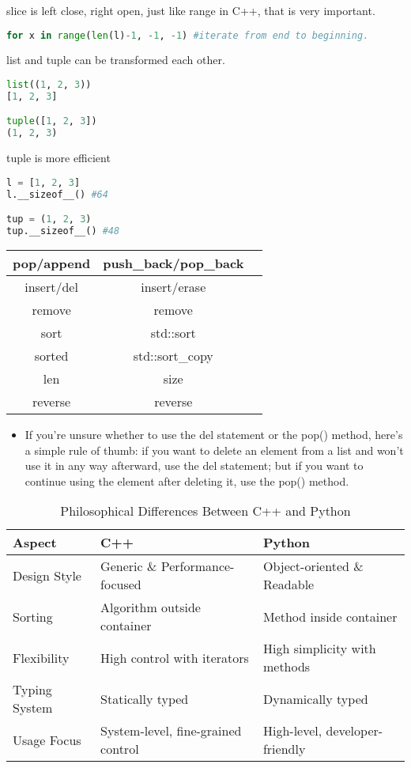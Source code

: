 \documentclass[a4paper,12pt,twoside]{book}
\begin{document}
slice is left close, right open, just like range in C++, that is very important.
\begin{lstlisting}[frame=single, language=Python]
for x in range(len(l)-1, -1, -1) #iterate from end to beginning.
\end{lstlisting}  

list and tuple can be transformed each other.
\begin{lstlisting}[frame=single, language=Python]
list((1, 2, 3))
[1, 2, 3]

tuple([1, 2, 3])
(1, 2, 3)
\end{lstlisting}  

tuple is more efficient 
\begin{lstlisting}[frame=single, language=Python]
l = [1, 2, 3]
l.__sizeof__() #64

tup = (1, 2, 3)
tup.__sizeof__() #48
\end{lstlisting}  

\begin{tabular}{|c|c|c|}
	\hline
pop/append	& push\_back/pop\_back  &  \\
	\hline
insert/del	& insert/erase &  \\
	\hline
remove	& remove &  \\
	\hline
sort & std::sort  &  \\
	\hline
sorted	& std::sort\_copy &  \\
	\hline
len	& size &  \\
\hline
reverse	& reverse &  \\
\hline
\end{tabular}
 
\begin{itemize}
	\item If you're unsure whether to use the del statement or the pop() method, here's a simple rule of thumb: if you want to delete an element from a list and won't use it in any way afterward, use the del statement; but if you want to continue using the element after deleting it, use the pop() method.
\end{itemize}


\begin{table}[h!]
	\centering
	\begin{tabular}{|l|l|l|}
		\hline
		\textbf{Aspect} & \textbf{C++} & \textbf{Python} \\
		\hline
		Design Style & Generic \& Performance-focused & Object-oriented \& Readable \\
		\hline
		Sorting & Algorithm outside container & Method inside container \\
		\hline
		Flexibility & High control with iterators & High simplicity with methods \\
		\hline
		Typing System & Statically typed & Dynamically typed \\
		\hline
		Usage Focus & System-level, fine-grained control & High-level, developer-friendly \\
		\hline
	\end{tabular}
	\caption{Philosophical Differences Between C++ and Python}
\end{table}
\end{document}
